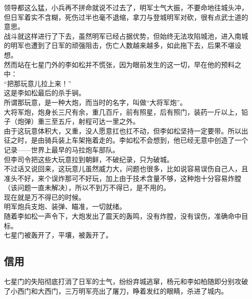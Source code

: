 \begin{multicols}{\theparacolNo}
领导都这么猛，小兵再不拼命就说不过去了，明军士气大振，不要命地往城头冲，但日军着实不含糊，死伤过半也毫不退缩，拿刀与登城明军对砍，很有点武士道的意思。\\

战斗就这样进行了下去，虽然明军已经占据优势，但始终无法攻陷城池，进入南城的明军也遭到了日军的顽强阻击，伤亡人数越来越多，如此拖下去，后果不堪设想。\\

然而站在七星门外的李如松并不慌张，因为眼前发生的这一切，早在他的预料之中：\\

“把那玩意儿拉上来！”\\

这是李如松最后的杀手锏。\\

所谓那玩意，是一种大炮，而当时的名字，叫做“大将军炮”。\\

大将军炮，炮身长三尺有余，重几百斤，前有照星，后有照门，装药一斤以上，铅子（炮弹）重三至五斤，射程可达一里之外。\\

由于这玩意体积大，又重，没人愿意扛也扛不动，但李如松坚持一定要带。所以出征之时，是由骑兵装上车架拖着走的。李如松不会想到，他已经无意中创造了一个记录——世界上最早的马拉炮车部队。\\

但李司令把这些大玩意拉到朝鲜，不破纪录，只为破城。\\

不过话又说回来，这玩意儿虽然威力大，问题也很多，比如说容易误伤自己人，且准头不好，来个误炸那可不好玩，加上由于技术含量不够，这种炮十分容易炸膛（该问题一直未解决），所以不到万不得已，是不用的。\\

现在就是万不得已的时候。\\

明军炮兵支炮、装弹、瞄准，一切就绪。\\

随着李如松一声令下，大炮发出了震天的轰鸣，没有炸膛，没有误伤，准确命中目标。\\

七星门被轰开了，平壤，被轰开了。\\

\subsection{信用}
七星门的失陷彻底打消了日军的士气，纷纷弃城逃窜，杨元和李如柏随即分别攻破了小西门和大西门，三万明军亮出了屠刀，睁着发红的眼睛，杀进了城内。\\


\end{multicols}
